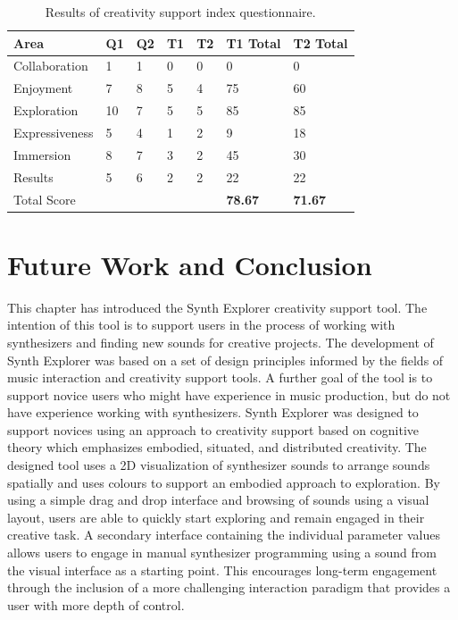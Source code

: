\begin{table}[th]
\centering
\begin{tabular}{l|llll|ll}
Area           & Q1 & Q2 & T1 & T2 & T1 Total   & T2 Total \\
\hline
Collaboration  & 1  & 1  & 0            & 0            & 0              & 0            \\
Enjoyment      & 7  & 8  & 5            & 4            & 75             & 60           \\
Exploration    & 10 & 7  & 5            & 5            & 85             & 85           \\
Expressiveness & 5  & 4  & 1            & 2            & 9              & 18           \\
Immersion      & 8  & 7  & 3            & 2            & 45             & 30           \\
Results        & 5  & 6  & 2            & 2            & 22             & 22           \\
Total Score    &    &    &              &              & \textbf{78.67} & \textbf{71.67} 
\end{tabular}
\caption{Results of creativity support index questionnaire.}
\label{table:csi}
\end{table}

\section{Future Work and Conclusion}
This chapter has introduced the Synth Explorer creativity support tool. The intention of this tool is to support users in the process of working with synthesizers and finding new sounds for creative projects. The development of Synth Explorer was based on a set of design principles informed by the fields of music interaction and creativity support tools. A further goal of the tool is to support novice users who might have experience in music production, but do not have experience working with synthesizers. Synth Explorer was designed to support novices using an approach to creativity support based on cognitive theory which emphasizes embodied, situated, and distributed creativity. The designed tool uses a 2D visualization of synthesizer sounds to arrange sounds spatially and uses colours to support an embodied approach to exploration. By using a simple drag and drop interface and browsing of sounds using a visual layout, users are able to quickly start exploring and remain engaged in their creative task. A secondary interface containing the individual parameter values allows users to engage in manual synthesizer programming using a sound from the visual interface as a starting point. This encourages long-term engagement through the inclusion of a more challenging interaction paradigm that provides a user with more depth of control.

